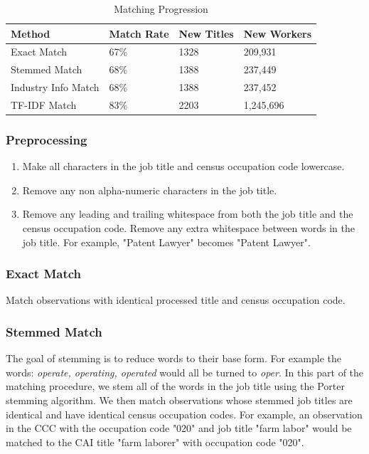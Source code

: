 \documentclass[12pt]{article}
\begin{document}
    \begin{table}[h!]
      \centering
      \caption{Matching Progression}
      \begin{tabular}{|l|l|l|l|}
      \hline
      \textbf{Method}     & \textbf{Match Rate} & \textbf{New Titles} & \textbf{New Workers} \\ \hline
      Exact Match         & 67\%                & 1328                & 209,931              \\ \hline
      Stemmed Match       & 68\%                & 1388                & 237,449              \\ \hline
      Industry Info Match & 68\%                & 1388                & 237,452              \\ \hline
      TF-IDF Match        & 83\%                & 2203                & 1,245,696            \\ \hline
      \end{tabular}
    \end{table}

    \subsubsection{Preprocessing}
      \begin{enumerate}
        \item Make all characters in the job title and census occupation code lowercase.
        \item Remove any non alpha-numeric characters in the job title.
        \item Remove any leading and trailing whitespace from both the job title and the census occupation code. Remove any extra whitespace between words in the job title. For example, "Patent \space \space \space Lawyer" becomes "Patent Lawyer".
      \end{enumerate}

    \subsubsection{Exact Match}
      Match observations with identical processed title and census occupation code.

    \subsubsection{Stemmed Match}
      The goal of stemming is to reduce words to their base form. For example the words: \textit{operate, operating, operated} would all be turned to \textit{oper}. In this part of the matching procedure, we stem all of the words in the job title using the Porter stemming algorithm. We then match observations whose stemmed job titles are identical and have identical census occupation codes. For example, an observation in the CCC with the occupation code "020" and job title "farm labor" would be matched to the CAI title "farm laborer" with occupation code "020".
\end{document}
